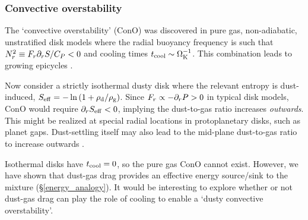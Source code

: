 

\subsubsection{Convective overstability}
The `convective overstability' (ConO) was discovered in pure gas, non-adiabatic, unstratified disk models    
where the radial buoyancy frequency is such that $N_r^2\equiv
F_r\partial_rS/C_P  < 0 $ and cooling times $t_\mathrm{cool}\sim \Omega_{\rm K}^{-1}$. This
combination leads to growing epicycles
\citep{klahr14,lyra14,latter16}.     


Now consider a strictly isothermal dusty disk where the relevant 
entropy is dust-induced, $S_\mathrm{eff} =-\ln{(1+\rho_\mathrm{d}/\rho_\mathrm{g})}$. 
Since $F_r\propto -\partial_rP > 0$ in typical disk models, ConO would
require $\partial_rS_\mathrm{eff}<0$, implying the dust-to-gas ratio increases
\emph{outwards}. This might be realized at special radial locations in 
protoplanetary disks, such as planet gaps. Dust-settling itself may
also lead to the mid-plane dust-to-gas ratio to increase outwards
\citep{takeuchi02}. 


Isothermal disks have $t_\mathrm{cool}=0$, so the pure gas ConO cannot
exist. However, we have shown that dust-gas drag provides an effective
energy source/sink to the mixture (\S\ref{energy_analogy}). It would be
interesting to explore whether or not dust-gas drag can play the role
of cooling to enable a `dusty convective 
overstability'. 




